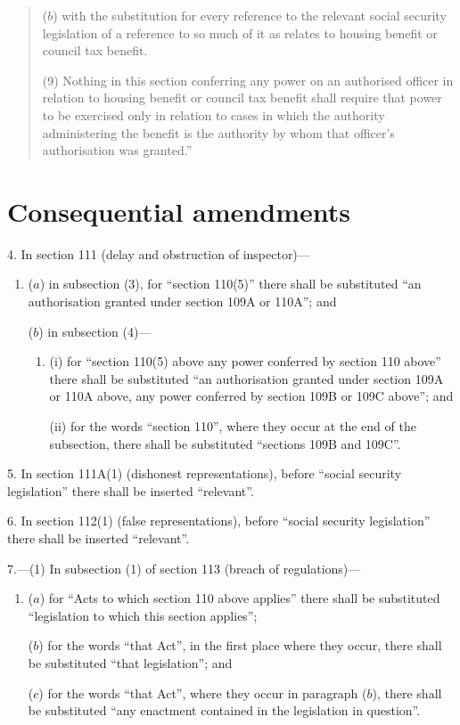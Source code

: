 \documentclass[12pt,a4paper]{article}
\begin{document}
\begin{quotation}
\begin{enumerate}
($b$) with the substitution for every reference to the relevant social security legislation of a reference to so much of it as relates to housing benefit or council tax benefit.
\end{enumerate}

(9) Nothing in this section conferring any power on an authorised officer in relation to housing benefit or council tax benefit shall require that power to be exercised only in relation to cases in which the authority administering the benefit is the authority by whom that officer’s authorisation was granted.”
\end{quotation}

\section*{Consequential amendments}

4. In section 111 (delay and obstruction of inspector)—
\begin{enumerate}\item[]
($a$) in subsection (3), for “section 110(5)” there shall be substituted “an authorisation granted under section 109A or 110A”; and

($b$) in subsection (4)—
\begin{enumerate}\item[]
(i) for “section 110(5)  above any power conferred by section 110 above” there shall be substituted “an authorisation granted under section 109A or 110A above, any power conferred by section 109B or 109C above”; and

(ii) for the words “section 110”, where they occur at the end of the subsection, there shall be substituted “sections 109B and 109C”.
\end{enumerate}
\end{enumerate}

\medskip

5. In section 111A(1)  (dishonest representations), before “social security legislation” there shall be inserted “relevant”.

\medskip

6. In section 112(1)  (false representations), before “social security legislation” there shall be inserted “relevant”.

\medskip

7.---(1) In subsection (1)  of section 113 (breach of regulations)—
\begin{enumerate}\item[]
($a$) for “Acts to which section 110 above applies” there shall be substituted “legislation to which this section applies”;

($b$) for the words “that Act”, in the first place where they occur, there shall be substituted “that legislation”; and

($c$) for the words “that Act”, where they occur in paragraph ($b$), there shall be substituted “any enactment contained in the legislation in question”.
\end{enumerate}
\end{document}
